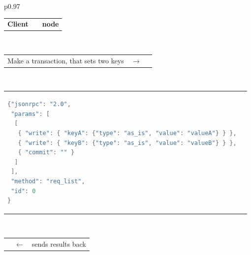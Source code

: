 \documentclass[a4paper]{scrreprt}
\begin{document}
\begin{longtable}{p{}}
\begin{tabular}{p{}cp{}}
\bf Client & & \hfill\bf \scalaris{} node \\
\end{tabular} \\
%
\begin{tabular}{p{}cp{}}
Make a transaction, that sets two keys & $\to$ & \\
\end{tabular}\vspace{-1.5em} \\
%
\begin{tabular}{p{}p{}}
\vspace{-1.5em}%
\begin{lstlisting}[language=java]
{"jsonrpc": "2.0",
 "params": [
  [
   { "write": { "keyA": {"type": "as_is", "value": "valueA"} } },
   { "write": { "keyB": {"type": "as_is", "value": "valueB"} } },
   { "commit": "" }
  ]
 ],
 "method": "req_list",
 "id": 0
}
\end{lstlisting}
& \\
\end{tabular}\vspace{-1em} \\
%
\begin{tabular}{p{}cp{}}
 & $\leftarrow$ & \hfill{}\scalaris{} sends results back \\
\end{tabular}\vspace{-1.5em} \\


\end{longtable}
\end{document}
